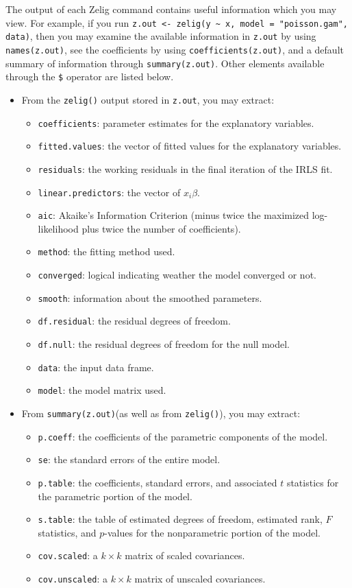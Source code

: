 The output of each Zelig command contains useful information which you may view. For example, if you run {\tt z.out <- zelig(y \~{} x, model = "poisson.gam", data)}, then you may examine the available information in {\tt z.out} by using {\tt names(z.out)}, see the coefficients by using {\tt coefficients(z.out)}, and a default summary of information through {\tt summary(z.out)}. Other elements available through the {\tt \$} operator are listed below. 
\begin{itemize}
\item From the {\tt zelig()} output stored in {\tt  z.out}, you may extract:
\begin{itemize}
\item {\tt coefficients}: parameter estimates for the explanatory variables.
\item {\tt fitted.values}: the vector of fitted values for the explanatory variables.
\item {\tt residuals}: the working residuals in the final iteration of the IRLS fit. 
\item {\tt linear.predictors}: the vector of $x_{i}\beta$.
\item {\tt aic}: Akaike's Information Criterion (minus twice the maximized log-likelihood plus twice the number of coefficients).
\item {\tt method}: the fitting method used.
\item {\tt converged}: logical indicating weather the model converged or not.
\item {\tt smooth}: information about the smoothed parameters.
\item {\tt df.residual}: the residual degrees of freedom.
\item {\tt df.null}: the residual degrees of freedom for the null model. 
\item {\tt data}: the input data frame. 
\item {\tt model}: the model matrix used.


\end{itemize}
\item From {\tt summary(z.out)}(as well as from {\tt zelig()}), you may extract:
\begin{itemize}
\item {\tt p.coeff}: the coefficients of the parametric components of the model. 
\item {\tt se}: the standard errors of the entire model. 
\item {\tt p.table}: the coefficients, standard errors, and associated $t$ statistics for the parametric portion of the model. 
\item {\tt s.table}: the table of estimated degrees of freedom, estimated rank, $F$ statistics, and $p$-values for the nonparametric portion of the model. 
\item {\tt cov.scaled}: a $k \times k$ matrix of scaled covariances.
\item {\tt cov.unscaled}: a $k \times k$ matrix of unscaled covariances. 
\end{itemize}



\end{itemize}
